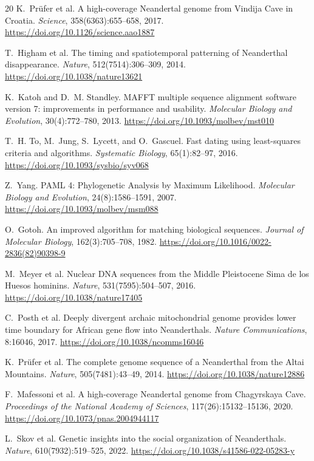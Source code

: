 \documentclass[10pt,letterpaper]{article}
\begin{document}
\begin{thebibliography}{20}
K.~Pr{\"u}fer et al.
\newblock A high-coverage Neandertal genome from Vindija Cave in Croatia.
\newblock \emph{Science}, 358(6363):655--658, 2017. \url{https://doi.org/10.1126/science.aao1887}

T.~Higham et al.
\newblock The timing and spatiotemporal patterning of Neanderthal disappearance.
\newblock \emph{Nature}, 512(7514):306--309, 2014. \url{https://doi.org/10.1038/nature13621}

K.~Katoh and D.~M. Standley.
\newblock MAFFT multiple sequence alignment software version 7: improvements in performance and usability.
\newblock \emph{Molecular Biology and Evolution}, 30(4):772--780, 2013. \url{https://doi.org/10.1093/molbev/mst010}

T.~H. To, M.~Jung, S.~Lycett, and O.~Gascuel.
\newblock Fast dating using least-squares criteria and algorithms.
\newblock \emph{Systematic Biology}, 65(1):82--97, 2016. \url{https://doi.org/10.1093/sysbio/syv068}

Z.~Yang.
\newblock PAML 4: Phylogenetic Analysis by Maximum Likelihood.
\newblock \emph{Molecular Biology and Evolution}, 24(8):1586--1591, 2007. \url{https://doi.org/10.1093/molbev/msm088}

O.~Gotoh.
\newblock An improved algorithm for matching biological sequences.
\newblock \emph{Journal of Molecular Biology}, 162(3):705--708, 1982. \url{https://doi.org/10.1016/0022-2836(82)90398-9}

M.~Meyer et al.
\newblock Nuclear DNA sequences from the Middle Pleistocene Sima de los Huesos hominins.
\newblock \emph{Nature}, 531(7595):504--507, 2016. \url{https://doi.org/10.1038/nature17405}

C.~Posth et al.
\newblock Deeply divergent archaic mitochondrial genome provides lower time boundary for African gene flow into Neanderthals.
\newblock \emph{Nature Communications}, 8:16046, 2017. \url{https://doi.org/10.1038/ncomms16046}

K.~Pr{\"u}fer et al.
\newblock The complete genome sequence of a Neanderthal from the Altai Mountains.
\newblock \emph{Nature}, 505(7481):43--49, 2014. \url{https://doi.org/10.1038/nature12886}

F.~Mafessoni et al.
\newblock A high-coverage Neandertal genome from Chagyrskaya Cave.
\newblock \emph{Proceedings of the National Academy of Sciences}, 117(26):15132--15136, 2020. \url{https://doi.org/10.1073/pnas.2004944117}

L.~Skov et al.
\newblock Genetic insights into the social organization of Neanderthals.
\newblock \emph{Nature}, 610(7932):519--525, 2022. \url{https://doi.org/10.1038/s41586-022-05283-y}
\end{thebibliography}
\end{document}
